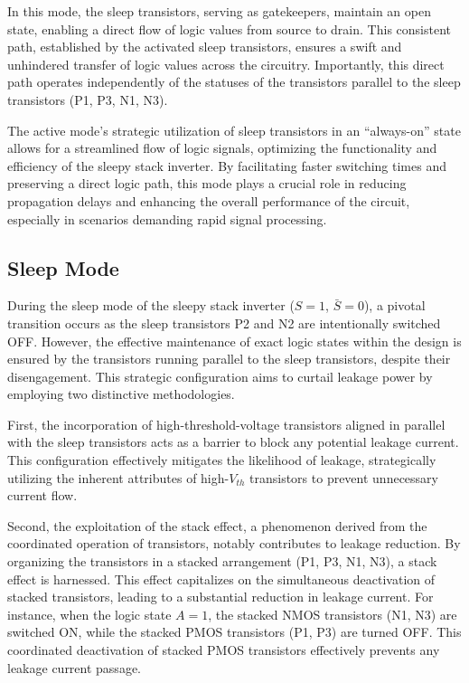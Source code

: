 \documentclass[conference]{IEEEtran}
\begin{document}
In this mode, the sleep transistors, serving as gatekeepers, maintain an open state, enabling a direct flow of logic values from source to drain. This consistent path, established by the activated sleep transistors, ensures a swift and unhindered transfer of logic values across the circuitry. Importantly, this direct path operates independently of the statuses of the transistors parallel to the sleep transistors (P1, P3, N1, N3).

The active mode's strategic utilization of sleep transistors in an ``always-on'' state allows for a streamlined flow of logic signals, optimizing the functionality and efficiency of the sleepy stack inverter. By facilitating faster switching times and preserving a direct logic path, this mode plays a crucial role in reducing propagation delays and enhancing the overall performance of the circuit, especially in scenarios demanding rapid signal processing.

\subsection{Sleep Mode}

During the sleep mode of the sleepy stack inverter ($S=1$, $\bar{S}=0$), a pivotal transition occurs as the sleep transistors P2 and N2 are intentionally switched OFF. However, the effective maintenance of exact logic states within the design is ensured by the transistors running parallel to the sleep transistors, despite their disengagement. This strategic configuration aims to curtail leakage power by employing two distinctive methodologies.

First, the incorporation of high-threshold-voltage transistors aligned in parallel with the sleep transistors acts as a barrier to block any potential leakage current. This configuration effectively mitigates the likelihood of leakage, strategically utilizing the inherent attributes of high-$V_{th}$ transistors to prevent unnecessary current flow.

Second, the exploitation of the stack effect, a phenomenon derived from the coordinated operation of transistors, notably contributes to leakage reduction. By organizing the transistors in a stacked arrangement (P1, P3, N1, N3), a stack effect is harnessed. This effect capitalizes on the simultaneous deactivation of stacked transistors, leading to a substantial reduction in leakage current. For instance, when the logic state $A=1$, the stacked NMOS transistors (N1, N3) are switched ON, while the stacked PMOS transistors (P1, P3) are turned OFF. This coordinated deactivation of stacked PMOS transistors effectively prevents any leakage current passage.
\end{document}
